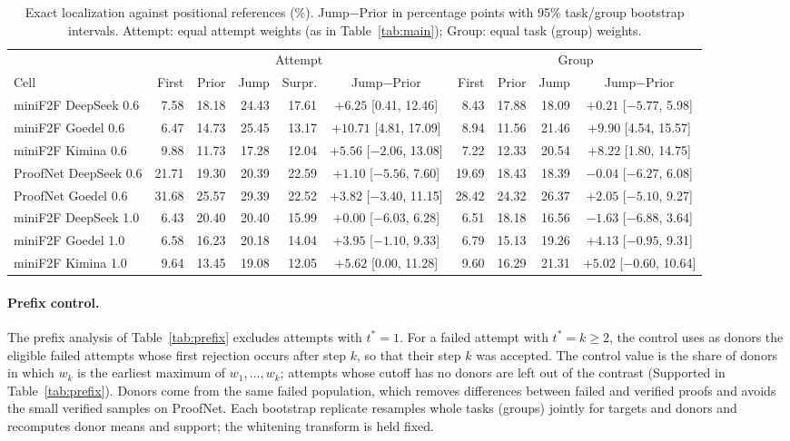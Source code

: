 \begin{table}[h]
\caption{Exact localization against positional references (\%). Jump$-$Prior in percentage points with 95\% task/group bootstrap intervals. Attempt: equal attempt weights (as in Table~\ref{tab:main}); Group: equal task (group) weights.}
\label{tab:positional}
\begin{center}
\scriptsize
\setlength{\tabcolsep}{1.8pt}
\begin{tabular}{lrrrrcrrrc}
\toprule
& \multicolumn{5}{c}{Attempt} & \multicolumn{4}{c}{Group}\\
\cmidrule(lr){2-6}\cmidrule(lr){7-10}
Cell & First & Prior & Jump & Surpr. & Jump$-$Prior & First & Prior & Jump & Jump$-$Prior\\
\midrule
miniF2F DeepSeek 0.6 & 7.58 & 18.18 & 24.43 & 17.61 & $+6.25$ [0.41, 12.46] & 8.43 & 17.88 & 18.09 & $+0.21$ [$-5.77$, 5.98]\\
miniF2F Goedel 0.6 & 6.47 & 14.73 & 25.45 & 13.17 & $+10.71$ [4.81, 17.09] & 8.94 & 11.56 & 21.46 & $+9.90$ [4.54, 15.57]\\
miniF2F Kimina 0.6 & 9.88 & 11.73 & 17.28 & 12.04 & $+5.56$ [$-2.06$, 13.08] & 7.22 & 12.33 & 20.54 & $+8.22$ [1.80, 14.75]\\
ProofNet DeepSeek 0.6 & 21.71 & 19.30 & 20.39 & 22.59 & $+1.10$ [$-5.56$, 7.60] & 19.69 & 18.43 & 18.39 & $-0.04$ [$-6.27$, 6.08]\\
ProofNet Goedel 0.6 & 31.68 & 25.57 & 29.39 & 22.52 & $+3.82$ [$-3.40$, 11.15] & 28.42 & 24.32 & 26.37 & $+2.05$ [$-5.10$, 9.27]\\
miniF2F DeepSeek 1.0 & 6.43 & 20.40 & 20.40 & 15.99 & $+0.00$ [$-6.03$, 6.28] & 6.51 & 18.18 & 16.56 & $-1.63$ [$-6.88$, 3.64]\\
miniF2F Goedel 1.0 & 6.58 & 16.23 & 20.18 & 14.04 & $+3.95$ [$-1.10$, 9.33] & 6.79 & 15.13 & 19.26 & $+4.13$ [$-0.95$, 9.31]\\
miniF2F Kimina 1.0 & 9.64 & 13.45 & 19.08 & 12.05 & $+5.62$ [0.00, 11.28] & 9.60 & 16.29 & 21.31 & $+5.02$ [$-0.60$, 10.64]\\
\bottomrule
\end{tabular}
\end{center}
\end{table}

\paragraph{Prefix control.} The prefix analysis of Table~\ref{tab:prefix} excludes attempts with $t^*=1$. For a failed attempt with $t^*=k\ge2$, the control uses as donors the eligible failed attempts whose first rejection occurs after step $k$, so that their step $k$ was accepted. The control value is the share of donors in which $w_k$ is the earliest maximum of $w_1,\dots,w_k$; attempts whose cutoff has no donors are left out of the contrast (Supported in Table~\ref{tab:prefix}). Donors come from the same failed population, which removes differences between failed and verified proofs and avoids the small verified samples on ProofNet. Each bootstrap replicate resamples whole tasks (groups) jointly for targets and donors and recomputes donor means and support; the whitening transform is held fixed.

